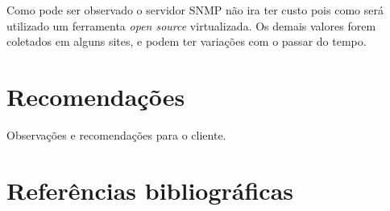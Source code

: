 \documentclass[	DIV=calc,%
							paper=a4,%
							fontsize=12pt,%
							onecolumn]{scrartcl}	 					%
\begin{document}
Como pode ser observado o servidor SNMP não ira ter custo pois como será utilizado um ferramenta \textit{open source} virtualizada. Os demais valores forem coletados em alguns sites, e podem ter variações com o passar do tempo. 

\section{Recomendações}
Observações e recomendações para o cliente.

\section{Referências bibliográficas}
\renewcommand\refname{} %

  
\end{document}
